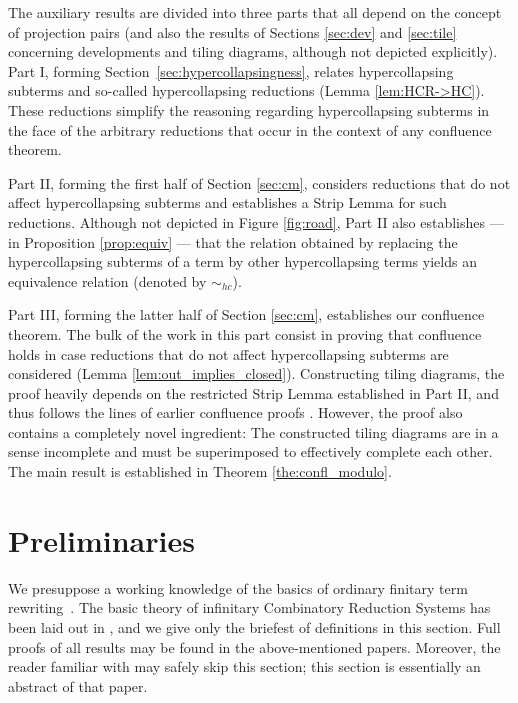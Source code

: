 \documentclass{LMCS}
\theoremstyle{plain}
\theoremstyle{definition}
\newcommand{\simhc}{\sim_{hc}}
\begin{document}
The auxiliary results are divided into three parts that all depend on the concept of projection pairs (and also the results of Sections \ref{sec:dev} and \ref{sec:tile} concerning developments and tiling diagrams, although not depicted explicitly). Part I, forming Section~\ref{sec:hypercollapsingness}, relates hypercollapsing subterms and so-called hypercollapsing reductions (Lemma  \ref{lem:HCR->HC}). These reductions simplify the reasoning regarding hypercollapsing subterms in the face of the arbitrary reductions that occur in the context of any confluence theorem.

Part II, forming the first half of Section \ref{sec:cm}, considers reductions that do not affect hypercollapsing subterms and establishes a Strip Lemma for such reductions. Although not depicted in Figure \ref{fig:road}, Part II also establishes --- in Proposition \ref{prop:equiv} --- that the relation obtained by replacing the hypercollapsing subterms of a term by other hypercollapsing terms yields an equivalence relation (denoted by $\simhc$).

Part III, forming the latter half of Section \ref{sec:cm}, establishes our confluence theorem. The bulk of the work in this part consist in proving that confluence holds in case reductions that do not affect hypercollapsing subterms are considered (Lemma \ref{lem:out_implies_closed}). Constructing tiling diagrams, the proof heavily depends on the restricted Strip Lemma established in Part II, and thus follows the lines of earlier confluence proofs \cite{T03}. However, the proof also contains a completely novel ingredient: The constructed tiling diagrams are in a sense incomplete and must be superimposed to effectively complete each other. The main result is established in Theorem \ref{the:confl_modulo}.


\section{Preliminaries}
\label{sec:preliminaries}



\noindent We presuppose a working knowledge of the basics of ordinary
finitary term rewriting~\cite{T03}. The basic theory of infinitary
Combinatory Reduction Systems has been laid out in \cite{JJ05a,JJ05b},
and we give only the briefest of definitions in this section. Full
proofs of all results may be found in the above-mentioned
papers. Moreover, the reader familiar with \cite{paper_i} may safely
skip this section; this section is essentially an abstract of that
paper.
\end{document}
